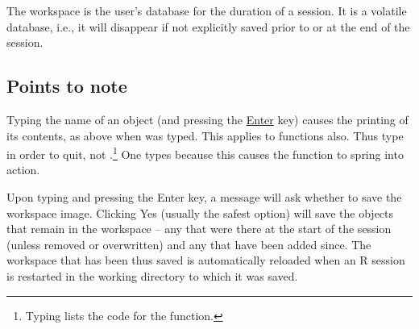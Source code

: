 The workspace is the user's database for the duration of a session.
It is a volatile database, i.e., it will disappear if not explicitly
saved prior to or at the end of the session.

\subsection{Points to note}
\noindent
{}
\vspace*{9pt}

Typing the name of an object (and pressing the \underline{Enter} key)
causes the printing of its contents, as above when  was
typed.  This applies to functions also. Thus type  in order
to quit, not .\footnote{Typing  lists the code for the
  function.}  One types  because this causes the function
 to spring into action.

Upon typing  and pressing the Enter key, a message will ask
whether to save the workspace image.
Clicking Yes (usually the safest
option) will save the objects that remain in the workspace -- any that
were there at the start of the session (unless removed or overwritten)
and any that have been added since.  The workspace that has been thus
saved is automatically reloaded when an R session is restarted in the
working directory to which it was saved.

